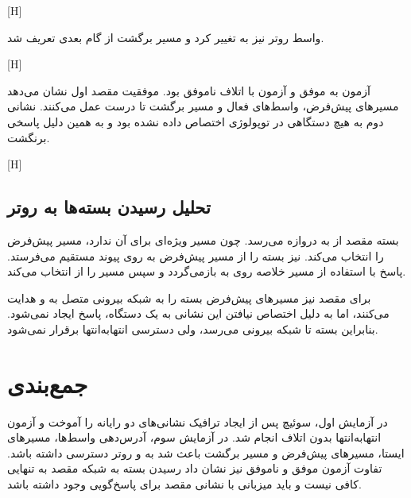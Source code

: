 [H]

واسط روتر  نیز به  تغییر کرد و مسیر برگشت
 از گام بعدی  تعریف شد.

[H]

آزمون  به  موفق و آزمون 
با اتلاف  ناموفق بود. موفقیت مقصد اول نشان می‌دهد مسیرهای پیش‌فرض،
واسط‌های فعال و مسیر برگشت تا  درست عمل می‌کنند. نشانی دوم به هیچ
دستگاهی در توپولوژی اختصاص داده نشده بود و به همین دلیل پاسخی برنگشت.

[H]

\subsection{تحلیل رسیدن بسته‌ها به روتر }

بسته مقصد  از  به دروازه  می‌رسد.
 چون مسیر ویژه‌ای برای آن ندارد، مسیر پیش‌فرض  را انتخاب می‌کند.
 نیز بسته را از مسیر پیش‌فرض به  روی پیوند مستقیم
 می‌فرستد. پاسخ با استفاده از مسیر خلاصه  روی
 به  بازمی‌گردد و سپس  مسیر
 را از  انتخاب می‌کند.

برای مقصد  نیز مسیرهای پیش‌فرض بسته را به شبکه بیرونی متصل به
 و  هدایت می‌کنند، اما به دلیل اختصاص نیافتن این نشانی به یک
دستگاه، پاسخ  ایجاد نمی‌شود. بنابراین بسته تا شبکه بیرونی می‌رسد،
ولی دسترسی انتهابه‌انتها برقرار نمی‌شود.

\section{جمع‌بندی}

در آزمایش اول، سوئیچ پس از ایجاد ترافیک نشانی‌های  دو رایانه را آموخت و
آزمون  انتهابه‌انتها بدون اتلاف انجام شد. در آزمایش سوم، آدرس‌دهی واسط‌ها،
مسیرهای ایستا، مسیرهای پیش‌فرض و مسیر برگشت باعث شد  به  و روتر
 دسترسی داشته باشد. تفاوت آزمون موفق و ناموفق نیز نشان داد رسیدن بسته
به شبکه مقصد به تنهایی کافی نیست و باید میزبانی با نشانی مقصد برای پاسخ‌گویی وجود داشته باشد.
